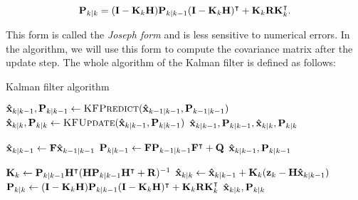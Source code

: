 \begin{equation}\label{eq:kf-joseph-form}
    \vecat{P}{k|k} =
    (\mathbf{I} - \vecat{K}{k}\mathbf{H})\vecat{P}{k|k-1}
    (\mathbf{I} - \vecat{K}{k}\mathbf{H})^\intercal
    + \vecat{K}{k} \mathbf{R} \vecat{K}{k}^\intercal.
\end{equation}

This form is called the \textit{Joseph form} and is less sensitive to numerical errors. In the algorithm, we will use this form to compute the covariance matrix after the update step. The whole algorithm of the Kalman filter is defined as follows:

\begin{algorithm}
\caption{Kalman filter algorithm}\label{alg:kf}
\begin{algorithmic}[1]
        \State $\vecat{\hat{x}}{k|k-1}, \vecat{P}{k|k-1} 
            \gets \Call{KFPredict}{\vecat{\hat{x}}{k-1|k-1}, \vecat{P}{k-1|k-1}}$
        \State $\vecat{\hat{x}}{k|k}, \vecat{P}{k|k} 
            \gets \Call{KFUpdate}{\vecat{\hat{x}}{k|k-1}, \vecat{P}{k|k-1}}$
        \State \Return $\vecat{\hat{x}}{k|k-1}, \vecat{P}{k|k-1}, \vecat{\hat{x}}{k|k}, \vecat{P}{k|k}$
    \EndProcedure
    
    \item[]
        \State 
            $\vecat{\hat{x}}{k|k-1} \gets \mathbf{F} \vecat{\hat{x}}{k-1|k-1}$
        \State
            $\vecat{P}{k|k-1} \gets \mathbf{F} \vecat{P}{k-1|k-1} \mathbf{F}^\intercal + \mathbf{Q}$
        \State \Return $\vecat{\hat{x}}{k|k-1}, \vecat{P}{k|k-1}$
    \EndProcedure

    \item[]
        \State
            $\vecat{K}{k} \gets \vecat{P}{k|k-1}\mathbf{H}^\intercal(\mathbf{H}\vecat{P}{k|k-1}\mathbf{H}^\intercal + \mathbf{R})^{-1}$
        \State
            $\vecat{\hat{x}}{k|k} \gets \vecat{\hat{x}}{k|k-1} + \vecat{K}{k}(\vecat{z}{k} - \mathbf{H}\vecat{\hat{x}}{k|k-1})$
        \State
            $\vecat{P}{k|k} \gets (\mathbf{I} - \vecat{K}{k}\mathbf{H})\vecat{P}{k|k-1} (\mathbf{I} - \vecat{K}{k}\mathbf{H})^\intercal + \vecat{K}{k} \mathbf{R} \vecat{K}{k}^\intercal$
        \State \Return $\vecat{\hat{x}}{k|k}, \vecat{P}{k|k}$
    \EndProcedure
\end{algorithmic}
\end{algorithm}

